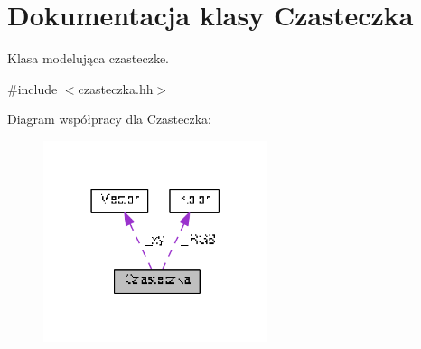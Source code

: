 \hypertarget{class_czasteczka}{}\section{Dokumentacja klasy Czasteczka}
\label{class_czasteczka}


Klasa modelująca czasteczke.  




{\ttfamily \#include $<$czasteczka.\+hh$>$}



Diagram współpracy dla Czasteczka\+:\nopagebreak
\begin{figure}[H]
\begin{center}
\leavevmode
\includegraphics[width=186pt]{class_czasteczka__coll__graph}
\end{center}
\end{figure}
